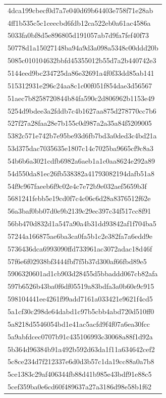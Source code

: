 \begin{tabular}{l}
4dca199cbecf0d7a7e040d69b64403e758f71e28ab \\
4ff1b535c5c1ceecbd6fdb12ca522eb0a61ac4586a \\
5033fa0bf8d5e896805d191057ab7d9fa7fef40f73 \\
50778d1a15027148ba94a9d3a098a5348c00ddd20b \\
5085c010104632bbfd45355012b55d7a2b440742e3 \\
5144eed9bc234725da86e32691a4f0f33dd85ab141 \\
515312931e296c24aa8c1c00f051f854dae3d56567 \\
51aec7b8258720844b84fa590c2d806962b1153e49 \\
5254d9bdee3a2fddb7c4b1627aa875d278770cc7b6 \\
527f27a28faa28e7b155c0d987a2a35a84f5209005 \\
5382c571e742b7e95be93d6fb7bd3a0ded3c4bd21a \\
53d375dac7035635e1807c14c7025ba9665cf9c8a3 \\
54b6b6a3021cdfb6982a6aeb1a1c0aa8624e292a89 \\
54d550da81ec26fb538382a41793082194dafb51a8 \\
54f9c967faeeb6f9c02e4c7e72b9e032aef5659b3f \\
5681241febb5e19cd0f7c4c06c6d28a8376512f62e \\
56a3baf0bb07d0e9b2139c29ec397c34f517cc8f91 \\
56bb470d832d1a547a90a4b31dd93842af1f704ba5 \\
57244a166875ae6ba3ca0fa5b1c2e382fa7a6edd9e \\
5736436dca6993090ffd733961ac3072adac18d46f \\
57f6e6f02938bf3444fbf7f5b37d300af66fbd89e5 \\
5906320601ad1cb903d28455d5bbaddd067cb82afa \\
597b6526b43ba0f6df05519a83bdfa3a0b60e9c915 \\
598104441ee4261f99add7161a033421e9621f4cd5 \\
5a1cf30c298de64dabd1c97b5cbb4abd720d510ff0 \\
5a8218d5546054bd1e41ac5acfd9f4f07a6ea30fcc \\
5a9abfdcec0707b91c435106993c30068a88f1d92a \\
5b364d96384b91a492b592d63da1f11a634642cef2 \\
5c8ce234d7f212337e6d0d3b57c1da19cc88a0a7b8 \\
5ce1383c29af406344fb88d41b985e43bdf91e88c5 \\
5cef359ba0e6cd60f489637a27a3186d98e58b1f62 \\

\end{tabular}
